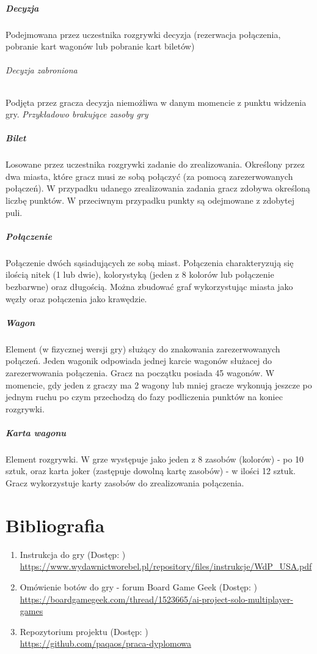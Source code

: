\documentclass[12pt, oneside]{report}
\begin{document}
\paragraph{Decyzja}
Podejmowana przez uczestnika rozgrywki decyzja (rezerwacja połączenia, pobranie kart wagonów lub pobranie kart biletów)
\subparagraph{Decyzja zabroniona}
Podjęta przez gracza decyzja niemożliwa w danym momencie z punktu widzenia gry. \textit{Przykładowo brakujące zasoby gry}
\paragraph{Bilet}
\label{dictionary:bilet}
Losowane przez uczestnika rozgrywki zadanie do zrealizowania. Określony przez dwa miasta, które gracz musi ze sobą połączyć (za pomocą zarezerwowanych połączeń). W przypadku udanego zrealizowania zadania gracz zdobywa określoną liczbę punktów. W przeciwnym przypadku punkty są odejmowane z zdobytej puli.
\paragraph{Połączenie}
Połączenie dwóch sąsiadujących ze sobą miast. Połączenia charakteryzują się ilością nitek (1 lub dwie), kolorystyką (jeden z 8 kolorów lub połączenie bezbarwne) oraz długością. Można zbudować graf wykorzystując miasta jako węzły oraz połączenia jako krawędzie.
\paragraph{Wagon} Element (w fizycznej wersji gry) służący do znakowania zarezerwowanych połączeń. Jeden wagonik odpowiada jednej karcie wagonów służacej do zarezerwowania połączenia. Gracz na początku posiada 45 wagonów. W momencie, gdy jeden z graczy ma 2 wagony lub mniej gracze wykonują jeszcze po jednym ruchu po czym przechodzą do fazy podliczenia punktów na koniec rozgrywki.
\paragraph{Karta wagonu} Element rozgrywki. W grze występuje jako jeden z 8 zasobów (kolorów) - po 10 sztuk, oraz karta joker (zastępuje dowolną kartę zasobów) - w ilości 12 sztuk. Gracz wykorzystuje karty zasobów do zrealizowania połączenia.
\chapter{Bibliografia}
\begin{enumerate}
	\item{Instrukcja do gry}
	\subitem (Dostęp: ) \\ \url{https://www.wydawnictworebel.pl/repository/files/instrukcje/WdP_USA.pdf}
	\item{Omówienie botów do gry - forum Board Game Geek}
	\subitem (Dostęp: ) \\ 
	\url{https://boardgamegeek.com/thread/1523665/ai-project-solo-multiplayer-games}
	\item{Repozytorium projektu}
	\subitem(Dostęp: ) \\ \url{https://github.com/paqaos/praca-dyplomowa}
\end{enumerate}
\end{document}
